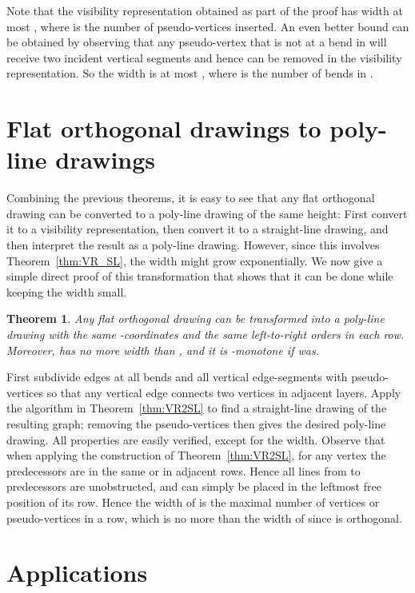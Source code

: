 \documentclass{elsarticle}
\newtheorem{theorem}{Theorem}
\newenvironment{proof}{{\bf Proof: }}{\hspace*{\fill}\medskip}
\begin{document}
Note that the visibility representation obtained as part of the
proof has width at most , where  is the number
of pseudo-vertices inserted.  An even better bound can be obtained
by observing that any pseudo-vertex that is not at a bend in   
will receive two incident vertical segments and hence can be removed
in the visibility representation.
So the width is 
at most , where  is the number of bends
in .

\section{Flat orthogonal drawings to poly-line drawings}
\label{se:VR_PL}


Combining the previous theorems, it is easy to see that
any flat orthogonal drawing can be converted to a poly-line
drawing of the same height:  First convert it to a visibility
representation, then convert it to a straight-line drawing,
and then interpret the result as a poly-line drawing.
However, since this involves Theorem~\ref{thm:VR_SL}, the
width might grow exponentially.  We now give a simple direct
proof of this transformation that shows that it can be done
while keeping the width small.

\begin{theorem}
Any flat orthogonal drawing  can be transformed into a 
poly-line drawing  with the same -coordinates
and the same left-to-right orders in each row.
Moreover,  has no more width than ,
and it is -monotone if  was.
\end{theorem}
\begin{proof}
First subdivide edges at all bends and all vertical edge-segments 
with pseudo-vertices so that
any vertical edge connects two vertices in adjacent layers.  
Apply the algorithm in Theorem~\ref{thm:VR2SL} to find a straight-line drawing 
of the resulting graph; 
removing the pseudo-vertices then gives the desired poly-line drawing.
All properties are easily verified, except for the width.  Observe
that when applying the construction of Theorem~\ref{thm:VR2SL},
for any vertex  the predecessors are in the same or in adjacent
rows.  Hence all lines from  to predecessors are unobstructed,
and  can simply be placed in the leftmost free position of its row.
Hence the width of  is the maximal number of vertices or 
pseudo-vertices in a row, which is no more than the width
of  since  is orthogonal.
\end{proof}

\section{Applications}
\end{document}

